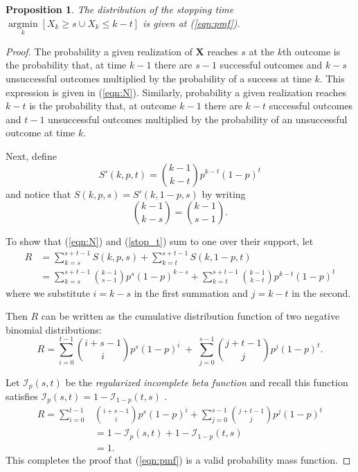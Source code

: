 \documentclass[review]{elsarticle}
\DeclareMathOperator*{\argmin}{argmin}
\newcommand*{\argminl}{\argmin\limits}
\newtheorem{prop}{Proposition}
\begin{document}
\begin{prop}
The distribution of the stopping time
$\argminl_k \left[X_k \geq s \cup X_k \leq k-t \right]$
is given at (\ref{eqn:pmf}).
\end{prop}
\begin{proof}

The probability a given realization of $\mathbf{X}$ reaches $s$ at
the $k$th outcome is the probability that, at time $k-1$ there are $s-1$
successful outcomes and $k-s$ unsuccessful outcomes multiplied by
the probability of a success at time $k$. This expression is given
in (\ref{eqn:N}). 
Similarly, probability a given realization reaches $k-t$
is the probability that, at outcome $k-1$ there are $k-t$ successful outcomes
and $t-1$ unsuccessful outcomes multiplied by the probability of an
unsuccessful outcome at time $k$.  

Next, define
\begin{equation} \label{stop_t}
S'(k, p, t) = {k-1 \choose k-t} p^{k-t} (1-p)^t
\end{equation}
and notice that $S(k, p, s) = S'(k, 1-p, s)$ by writing
\begin{equation*}
{k-1 \choose k-s} = {k-1 \choose s-1}.
\end{equation*}

To show that (\ref{eqn:N}) and (\ref{stop_t}) sum to one
over their support, let
\begin{align} \label{eqn:sum_proof}
R &= \sum_{k=s}^{s+t-1} S(k, p, s) + \sum_{k=t}^{s+t-1} S(k, 1-p, t) \\
  &= \sum_{k=s}^{s+t-1} {k-1 \choose s-1} p^s (1-p)^{k-s} + \sum_{k=t}^{s+t-1} {k-1 \choose k-t} p^{k-t} (1-p)^t
\end{align}
where we substitute $i=k-s$ in the first summation and $j=k-t$ in the second.

Then $R$ can be written as the cumulative distribution function of two
negative binomial distributions:
\begin{equation} \label{eqn:transformed_sum}
R = \sum_{i=0}^{t-1} {i+s-1 \choose i} p^s (1-p)^i \; + \;
\sum_{j=0}^{s-1} {j+t-1 \choose j} p^j (1-p)^t.
\end{equation}

Let $\mathcal{I}_p(s, t)$ be the {\em regularized incomplete beta function} 
\citep{Olver2010} and recall this function satisfies 
$\mathcal{I}_p(s, t) = 1-\mathcal{I}_{1-p}(t, s)$ \citep{Abramowitz1964}.
\begin{align*}
R = \sum_{i=0}^{t-1} &{i+s-1 \choose i} p^s (1-p)^i +
\sum_{j=0}^{s-1}  {j+t-1 \choose j} p^j  (1-p)^t \\
   &= 1-\mathcal{I}_p(s, t) + 1 - \mathcal{I}_{1-p}(t, s) \\
   &= 1. 
\end{align*}
This completes the proof that (\ref{eqn:pmf}) is a valid probability mass
function.
\end{proof}
\end{document}
